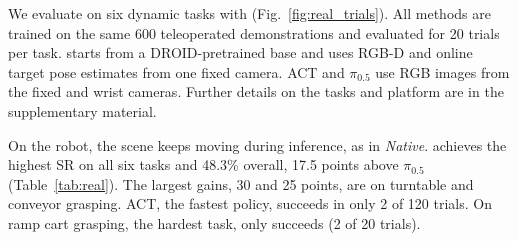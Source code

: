 

We evaluate on six dynamic tasks with \cfgRobot{} (Fig.~\ref{fig:real_trials}). All methods are trained on the same 600 teleoperated
demonstrations and evaluated for 20 trials per task. \ours starts from a
DROID-pretrained base \cite{droid} and uses RGB-D and online target pose estimates from
one fixed camera. ACT and $\pi_{0.5}$ use RGB images from the fixed and wrist cameras. Further
details on the tasks and platform are in the supplementary material.



On the robot, the scene keeps moving during inference, as in \emph{Native}. \ours
achieves the highest SR on all six tasks and 48.3\% overall, 17.5 points above
$\pi_{0.5}$ (Table~\ref{tab:real}). The largest gains, 30 and 25 points, are on
turntable and conveyor grasping. ACT, the fastest policy, succeeds in only 2 of 120
trials. On ramp cart grasping, the hardest task, only \ours succeeds
(2 of 20 trials).
